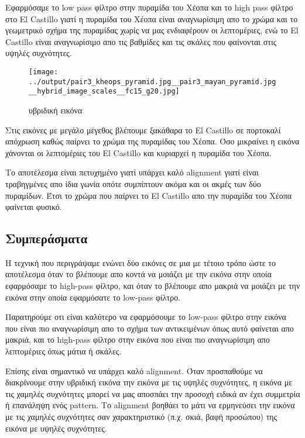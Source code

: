 \documentclass[11pt]{scrartcl} %
\begin{document}
Εφαρμόσαμε το low pass φίλτρο στην πυραμίδα του Χέοπα και το high pass φίλτρο στο El Castillo γιατί η πυραμίδα του Χέοπα είναι αναγνωρίσιμη απο το χρώμα και το γεωμετρικό σχήμα της πυραμίδας χωρίς να μας ενδιαφέρουν οι λεπτομέριες, ενώ το El Castillo είναι αναγνωρίσιμο απο τις βαθμίδες και τις σκάλες που φαίνονται στις υψηλές συχνότητες.

\begin{figure}[H]
  \texttt{[image: ../output/pair3\_kheops\_pyramid.jpg\_\_pair3\_mayan\_pyramid.jpg\_\_hybrid\_image\_scales\_\_fc15\_g20.jpg]}
  \caption{υβριδική εικόνα}
\end{figure}

Στις εικόνες με μεγάλο μέγεθος βλέπουμε ξακάθαρα το El Castillo σε πορτοκαλί απόχρωση καθώς παίρνει το χρώμα της πυραμίδας του Χέοπα. Όσο μικραίνει η εικόνα χάνονται οι λεπτομέριες του El Castillo και κυριαρχεί η πυραμίδα του Χέοπα.

Το αποτέλεσμα είναι πετυχημένο γιατί υπάρχει καλό alignment γιατί είναι τραβηγμένες απο ίδια γωνία οπότε συμπίπτουν ακόμα και οι ακμές των δύο πυραμίδων. Έτσι το χρώμα που παίρνει το El Castillo απο την πυραμίδα του Χέοπα φαίνεται φυσικό.

\subsection{Συμπεράσματα}

Η τεχνική που περιγράψαμε ενώνει δύο εικόνες σε μια με τέτοιο τρόπο ώστε το αποτέλεσμα όταν το βλέπουμε απο κοντά να μοιάζει με την εικόνα στην οποία εφαρμόσαμε το high-pass φίλτρο, και όταν το βλέπουμε απο μακριά να μοιάζει με την εικόνα στην οποία εφαρμόσατε το low-pass φίλτρο.

Παρατηρούμε οτι είναι καλύτερο να εφαρμόσουμε το low-pass φίλτρο στην εικόνα που είναι πιο αναγνωρίσιμη απο το σχήμα των αντικειμένων όπως αυτό φαίνεται απο μακριά,
και το high-pass φίλτρο στην εικόνα που είναι πιο αναγνωρίσιμη απο λεπτομέριες όπως μάτια ή σκάλες.

Επίσης είναι σημαντικό να υπάρχει καλό alignment.
Όταν προσπαθούμε να διακρίνουμε στην υβριδική εικόνα την εικόνα με τις υψηλές συχνότητες, η εικόνα με τις χαμηλές συχνότητες μπορεί να μας αποσπάει την προσοχή ειδικά αν έχει συμμετρία ή επανάληψη ενός pattern.
Το alignment βοηθάει το μάτι να ερμηνεύσει την εικόνα με τις χαμηλές συχνότητες σαν χαρακτηριστικό (π.χ. σκιά, βαφή προσώπου) της εικόνα με υψηλές συχνότητες.


\end{document}

